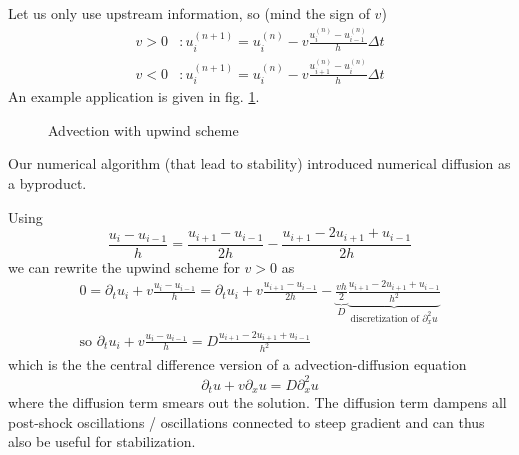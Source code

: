 Let us only use upstream information, so (mind the sign of $v$)
\begin{equation}
    \begin{aligned}
        v > 0&: u_i^{(n+1)} = u_i^{(n)} - v \frac{u_i^{(n)} - u_{i-1}^{(n)}}{h} \Delta t  \\
        v < 0&: u_i^{(n+1)} = u_i^{(n)} - v \frac{u_{i+1}^{(n)} - u_{i}^{(n)}}{h} \Delta t 
    \end{aligned}
\end{equation}
An example application is given in fig. \ref{fig:advection_upwind}.

\begin{figure}[htb!]
    \centering
    
    \caption{Advection with upwind scheme}
    \label{fig:advection_upwind}
\end{figure}


Our numerical algorithm (that lead to stability) introduced numerical diffusion as a byproduct.

Using
\begin{equation}
    \frac{u_i - u_{i-1}}{h} = \frac{u_{i + 1} - u_{i-1}}{2h} - \frac{u_{i + 1} - 2u_{i + 1} + u_{i-1}}{2h}
\end{equation}
we can rewrite the upwind scheme for $v > 0$ as
\begin{equation}
    \begin{gathered}
        0 = \partial_t u_i + v \frac{u_i - u_{i-1}}{h} = \partial_t u_i + v \frac{u_{i + 1} - u_{i-1}}{2h} - \underbrace{\frac{vh}{2}}_{D} \underbrace{\frac{u_{i + 1} - 2u_{i + 1} + u_{i-1}}{h^2}}_{\text{discretization of } \partial_x^2 u} \\
        \text{so } \partial_t u_i + v \frac{u_i - u_{i-1}}{h} = D \frac{u_{i + 1} - 2u_{i + 1} + u_{i-1}}{h^2}
    \end{gathered}
\end{equation}
which is the \textcolor{blue1}{the central difference version of a advection-diffusion equation}
\begin{equation}
    \partial_t u + v \partial_x u = D \partial_x^2 u
\end{equation}
where the diffusion term smears out the solution.
The diffusion term dampens all post-shock oscillations / oscillations connected to steep gradient
and can thus also be useful for stabilization.

